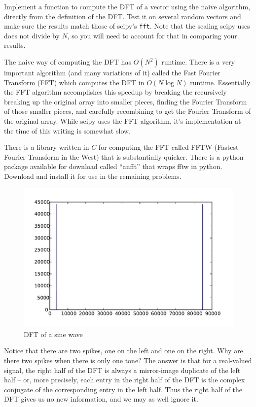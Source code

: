 \begin{problem}
Implement a function to compute the DFT of a vector using the naive algorithm, directly from the definition of the DFT. Test it on several random vectors and make sure the results match those of scipy's \texttt{fft}.  Note that the scaling scipy uses does not divide by $N$, so you will need to account for that in comparing your results.
\end{problem}

The naive way of computing the DFT has $O(N^2)$ runtime.  There is a very important algorithm (and many variations of it) called the Fast Fourier Transform (FFT) which computes the DFT in $O(N \log N)$ runtime.  Essentially the FFT algorithm accomplishes this speedup by breaking the recursively breaking up the original array into smaller pieces, finding the Fourier Transform of those smaller pieces, and carefully recombining to get the Fourier Transform of the original array.  While scipy uses the FFT algorithm, it's implementation at the time of this writing is somewhat slow.  

There is a library written in $C$ for computing the FFT called FFTW (Fastest Fourier Transform in the West) that is substantially quicker.  There is a python package available for download called ``anfft'' that wraps fftw in python.  Download and install it for use in the remaining problems.

\begin{figure}[ht]\caption{DFT of a sine wave}\label{sinespec}\centering\includegraphics[width=\textwidth]{sinespec}\end{figure}
Notice that there are two spikes, one on the left and one on the right. Why are there two spikes when there is only one tone? The answer is that for a real-valued signal, the right half of the DFT is always a mirror-image duplicate of the left half -- or, more precisely, each entry in the right half of the DFT is the complex conjugate of the corresponding entry in the left half. Thus the right half of the DFT gives us no new information, and we may as well ignore it.

